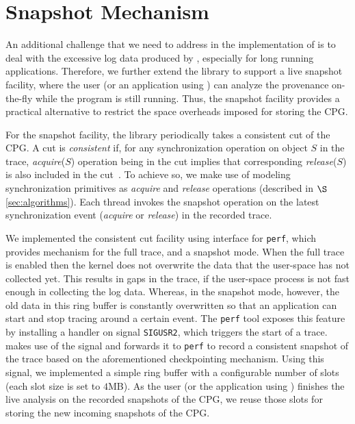 \section{Snapshot Mechanism}
\label{sec:snapshot}
An additional challenge that we need to address in the implementation of \projecttitle is to deal with the excessive log data produced by \intelpt, especially for long running applications. Therefore, we further extend the library to support a live snapshot facility, where the user (or an application using \projecttitle) can analyze the provenance on-the-fly while the program is still running. Thus, the snapshot facility provides a practical alternative to restrict the space overheads imposed for storing the CPG. 

For the snapshot facility, the library periodically takes a consistent cut of the CPG. A cut is {\em consistent} if, for any synchronization operation on object $S$ in the trace,  {\em acquire}($S$) operation being in the cut implies that corresponding {\em release}($S$) is also included in the cut~\cite{chandy-lamport}.  To achieve so, we make use of modeling synchronization primitives as {\em acquire} and {\em release} operations (described in $\S$\ref{sec:algorithms}). Each thread invokes the snapshot operation on the latest synchronization event ({\em acquire} or {\em release}) in the recorded trace.


We implemented the consistent cut facility using \intelpt interface for {\tt perf},
which provides mechanism for the full trace, and a snapshot mode.
When the full trace is enabled then the kernel does not overwrite the data that the user-space has not collected yet. %
This results in gaps in the trace, if the user-space process is not fast enough in collecting the log data. 
Whereas, in the snapshot mode, however, the old data in this ring buffer is constantly overwritten so that an application
can start and stop tracing around a certain event. %
The {\tt perf} tool exposes this feature by installing a handler on
signal {\tt SIGUSR2}, which triggers the start of a trace. \projecttitle makes use of the signal
and forwards it to {\tt perf} to record a consistent snapshot of the trace based on the aforementioned checkpointing mechanism.  Using this signal, we implemented a simple ring buffer with a configurable number of slots (each slot size is set to $4$MB). As the user (or the application using \projecttitle) finishes the live analysis on the recorded snapshots of the CPG, we reuse those slots for storing the new incoming snapshots of the CPG. %



